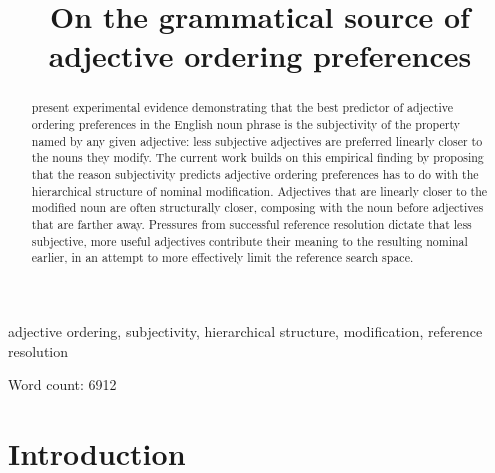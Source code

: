 \documentclass[preprint,authoryear]{elsarticle}\frenchspacing
\begin{document}
\frenchspacing 



\begin{frontmatter}

\title{On the grammatical source of adjective ordering preferences} 











\begin{abstract}
 \cite{scontrasetal2017adjectives} present experimental evidence demonstrating that the best predictor of adjective ordering preferences in the English noun phrase is the subjectivity of the property named by any given adjective: less subjective adjectives are preferred linearly closer to the nouns they modify. The current work builds on this empirical finding by proposing that the reason subjectivity predicts adjective ordering preferences has to do with the hierarchical structure of nominal modification. Adjectives that are linearly closer to the modified noun are often structurally closer, composing with the noun before adjectives that are farther away. Pressures from successful reference resolution dictate that less subjective, more useful adjectives contribute their meaning to the resulting nominal earlier, in an attempt to more effectively limit the reference search space.
\end{abstract}

\begin{keyword}
adjective ordering, subjectivity, hierarchical structure, modification, reference resolution
\end{keyword}

\end{frontmatter}

\noindent Word count: 6912

\section{Introduction}
\end{document}
